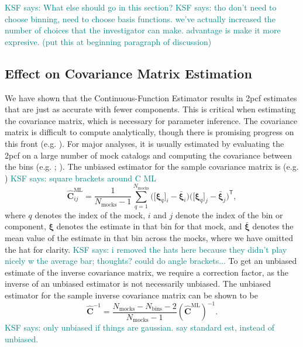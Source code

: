 \documentclass[modern]{aastex62}
\newcommand{\cf}{2pcf\xspace} %
\newcommand{\est}{the Continuous-Function Estimator\xspace}
\newcommand{\inv}{^{-1}}
\newcommand{\T}{^{\mathsf{T}}}
\newcommand{\bld}[1]{\bm{#1}} %
\newcommand{\NN}[1]{N_\mathrm{#1}}
\newcommand{\KSF}[1]{\textcolor{teal}{KSF says: #1}}
\begin{document}
\KSF{What else should go in this section?}
\KSF{tho don't need to choose binning, need to choose basis functions. we've actually increased the number of choices that the investigator can make. advantage is make it more expresive. (put this at beginning paragraph of discussion)}

\subsection{Effect on Covariance Matrix Estimation}
\label{sec:covariance}

We have shown that \est results in \cf estimates that are just as accurate with fewer components.
This is critical when estimating the covariance matrix, which is necessary for parameter inference.
The covariance matrix is difficult to compute analytically, though there is promising progress on this front (e.g. \citealt{Wadekar2020}).
For major analyses, it is usually estimated by evaluating the \cf on a large number of mock catalogs and computing the covariance between the bins (e.g. \citealt{Reid2010}; \citealt{Anderson2014}).
The unbiased estimator for the sample covariance matrix is (e.g. \citealt{Anderson2003})
\KSF{square brackets around C ML}
\begin{equation}
\bld{\hat{C}}^\mathrm{ML}_{ij} = \frac{1}{\NN{mocks}-1} \sum_{q=1}^{\NN{mocks}} \bigg( \big[\bld{\xi}_q \big]_i - \bar{\bld{\xi}}_i \bigg) \bigg([\bld{\xi}_q \big]_j - \bar{\bld{\xi}}_j \bigg)\T,
\end{equation}
where $q$ denotes the index of the mock, $i$ and $j$ denote the index of the bin or component, $\bld{\xi}$ denotes the estimate in that bin for that mock, and $\bar{\bld{\xi}}$ denotes the mean value of the estimate in that bin across the mocks, where we have omitted the hat for clarity. \KSF{i removed the hats here because they didn't play nicely w the average bar; thoughts? could do angle brackets...}
To get an unbiased estimate of the inverse covariance matrix, we require a correction factor, as the inverse of an unbiased estimator is not necessarily unbiased.
The unbiased estimator for the sample inverse covariance matrix can be shown to be \citep{Hartlap2007}
\begin{equation}
\bld{\hat{C}}\inv = \frac{\NN{mocks}-\NN{bins}-2}{\NN{mocks}-1} \left( \bld{\hat{C}}^\mathrm{ML} \right) \inv.
\end{equation}
\KSF{only unbiased if things are gaussian. say standard est, instead of unbiased.}
\end{document}
